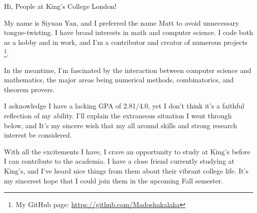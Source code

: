 \documentclass[11pt]{article}
\begin{document}
    Hi, People at King's College London!

    My name is Siyuan Yan,
    and I preferred the name Matt to avoid unnecessary tongue-twisting.
    I have broad interests in math and computer science.
    I code both as a hobby and in work, and I'm a contributor and creator of numerous projects
    \footnote{My GitHub page: \url{https://github.com/Madoshakalaka}}.

    In the meantime, I'm fascinated by the interaction between computer science and mathematics,
    the major areas being numerical methods, combinatorics, and theorem provers.

    I acknowledge I have a lacking GPA of 2.81/4.0, yet I don't think it's a faithful reflection of my ability.
    I'll explain the extraneous situation I went through below,
    and It's my sincere wish that my all around skills and strong research interest be considered.

    

    

    

    With all the excitements I have,
    I crave an opportunity to study at King's before I can contribute to the academia.
    I have a close friend currently studying at King's,
    and I've heard nice things from them about their vibrant college life.
    It's my sincerest hope that I could join them in the upcoming Fall semester.
\end{document}
